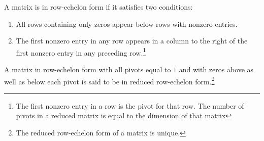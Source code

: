 \documentclass[nobib,notoc]{tufte-handout}
\begin{document}
\begin{defi}
 A matrix is in row-echelon form if it satisfies two conditions:	
	\begin{enumerate}
		\item All rows containing only zeros appear below rows with nonzero entries.
		\item The first nonzero entry in any row appears in a column to the right of the first nonzero entry in any preceding row.\footnote{The first nonzero entry in a row is the pivot for that row. The number of pivots in a reduced matrix is equal to the dimension of that matrix}
	\end{enumerate}
\end{defi}
\begin{defi}
	A matrix in row-echelon form with all pivots equal to \(1\) and with zeros above as well as below each pivot is said to be in reduced row-echelon form.\footnote{The reduced row-echelon form of a matrix is unique.}
\end{defi}
\end{document}
